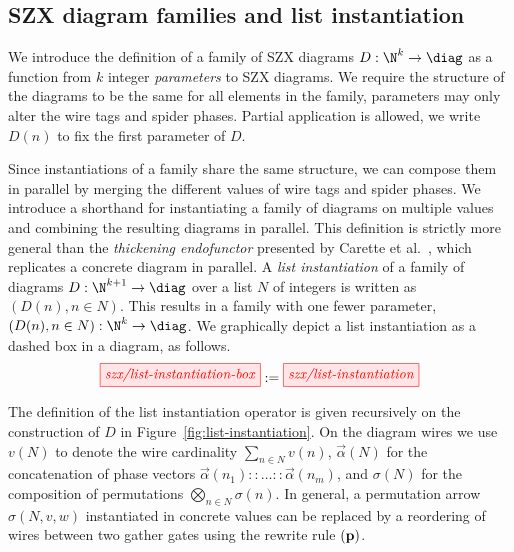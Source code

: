 
\subsection{SZX diagram families and list instantiation}

We introduce the definition of a family of SZX diagrams $D: \N^k \to \diag$
as a function from $k$ integer \textit{parameters} to SZX diagrams.
We require the structure of the diagrams to be the same for all elements in the family,
parameters may only alter the wire tags and spider phases.
Partial application is allowed, we write $D(n)$ to fix the first parameter of $D$.


Since instantiations of a family share the same structure,
we can compose them in parallel by merging the different values of wire tags and spider phases.
We introduce a shorthand for instantiating a family of diagrams on multiple values
and combining the resulting diagrams in parallel.
This definition is strictly more general than the \textit{thickening endofunctor}
presented by Carette et al.~\cite{carette_quantum_2021},
which replicates a concrete diagram in parallel.
A \textit{list instantiation} of a family of diagrams $D: \N^{k+1} \to \diag$ over
a list $N$ of integers is written as $(D(n), n \in N)$.
This results in a family with one fewer parameter, $(D(n), n \in N): \N^k \to \diag$. 
We graphically depict a list instantiation as a dashed box in a diagram, as follows.
\[\tikzfig{szx/list-instantiation-box} := \tikzfig{szx/list-instantiation}\]

The definition of the list instantiation operator is given recursively
on the construction of $D$ in Figure~\ref{fig:list-instantiation}.
On the diagram wires we use $v(N)$ to denote the wire cardinality $\sum_{n \in N} v(n)$,
$\overrightarrow\alpha(N)$ for the concatenation of phase vectors
$\overrightarrow\alpha(n_1) :: \dots :: \overrightarrow\alpha(n_m)$,
and $\sigma(N)$ for the composition of permutations $\bigotimes_{n \in N} \sigma(n)$.
In general, a permutation arrow $\sigma(N,v,w)$ instantiated in concrete values
can be replaced by a reordering of wires between two gather gates%
using the rewrite rule $\bf{(p)}$.

